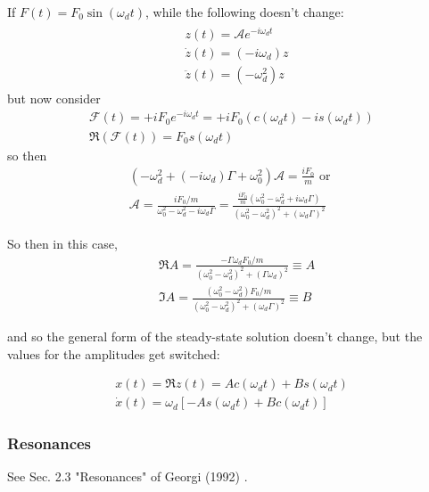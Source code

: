 \documentclass[10pt]{amsart}
\begin{document}
\begin{multicols*}{2}
If $F(t) = F_0 \sin{(\omega_d t)}$, while the following doesn't change:
\[
\begin{gathered}
\begin{aligned}
& z(t) = \mathcal{A} e^{-i\omega_d t} \\
& \dot{z}(t) = (-i \omega_d) z \\
& \ddot{z}(t) = (-\omega_d^2)z
\end{aligned}
\end{gathered}
\]
but now consider 
\[
\begin{gathered}
\mathcal{F}(t) = + i F_0 e^{-i\omega_d t} = +i F_0 (c(\omega_d t)  -i s(\omega_d t) ) \\
\Re{(\mathcal{F}(t) )} = F_0 s(\omega_dt)
\end{gathered}
\]
so then
\[
\begin{gathered}
	(-\omega_d^2 + (-i \omega_d)\Gamma + \omega_0^2)\mathcal{A} = \frac{iF_0}{m}  \text{ or } 	\\
	\mathcal{A} = \frac{ iF_0 / m }{ \omega_0^2 - \omega_d^2- i\omega_d \Gamma} = \frac{ \frac{iF_0}{m} (\omega_0^2 - \omega_d^2 + i \omega_d \Gamma  )}{ (\omega_0^2 - \omega_d^2)^2 + (\omega_d \Gamma)^2 }
\end{gathered}
\]

So then in this case, 
\begin{equation}\label{Eq:AmplitudeValuesForcedOscillationsForceProportionalToSine}
\begin{aligned}
& \Re{A} = \frac{ -\Gamma \omega_d F_0 /m }{ (\omega_0^2 - \omega_d^2)^2 + (\Gamma \omega_d )^2 } \equiv A \\
& \Im{A} = \frac{ (\omega_0^2 - \omega_d^2) F_0/m }{(\omega_0^2 - \omega_d^2)^2 + (\omega_d \Gamma)^2} \equiv B 
\end{aligned}
\end{equation}

and so the general form of the steady-state solution doesn't change, but the values for the amplitudes get switched:

\[
\begin{gathered}
x(t) = \Re{ z(t)} = Ac(\omega_d t) + Bs(\omega_dt) \\
\dot{x}(t) = \omega_d \left[ -A s(\omega_dt) + Bc(\omega_dt) \right]
\end{gathered}
\]

\subsubsection{Resonances} See Sec. 2.3 "Resonances" of Georgi (1992) \cite{Geor1992}.


\end{multicols*}
\end{document}

